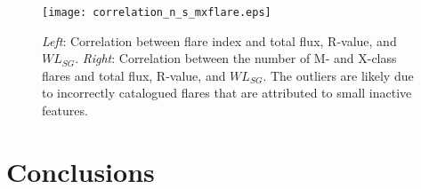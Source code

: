 \begin{landscape}
\begin{figure}[!t]
\centerline{\texttt{[image: correlation\_n\_s\_mxflare.eps]}}
\caption[Correlation between AR property time series and flaring.]{\emph{Left}: Correlation between flare index and total flux, R-value, and $WL_{SG}$. \emph{Right}: Correlation between the number of M- and X-class flares and total flux, R-value, and $WL_{SG}$. The outliers are likely due to incorrectly catalogued flares that are attributed to small inactive features.}
\label{fig:fltcmplxcorr}
\end{figure}
\end{landscape}


\section{Conclusions}

